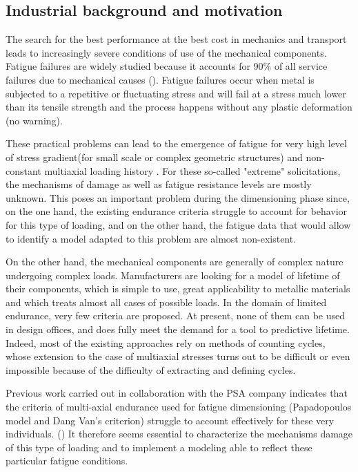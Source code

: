 \subsection{Industrial background and motivation}
The search for the best performance at the best cost in mechanics and
transport leads to increasingly
severe conditions of use of the mechanical components. Fatigue failures are widely studied
because it accounts for 90\% of all service
failures due to mechanical causes (\cite{sohar2011lifetime}).  Fatigue failures occur when metal is
subjected to a repetitive or fluctuating
stress and will fail at a stress much lower
than its tensile strength and the process happens without any plastic
deformation (no warning).

These practical problems can lead to the emergence of fatigue for
very high level of stress gradient(for small scale or complex geometric structures) and non-constant multiaxial loading history
. For these so-called "extreme" solicitations, the mechanisms of damage
as well as fatigue resistance levels are mostly unknown.
This poses an important problem during the dimensioning phase since, on the one hand, the
existing endurance criteria struggle to account for behavior for this type of
loading, and on the other hand, the fatigue data that would allow to identify a model
adapted to this problem are almost non-existent.

On the other hand, the mechanical components are generally of complex nature undergoing
complex loads. Manufacturers are looking for a model of lifetime
of their components, which is simple to use, great applicability to metallic materials
and which treats almost all cases of possible loads. In the domain of
limited endurance, very few criteria are proposed. At present, none of them
can be used in design offices, and does fully meet the demand for a tool to
predictive lifetime. Indeed, most of the existing approaches rely on
methods of counting cycles, whose extension to the case of multiaxial stresses turns out to be
difficult or even impossible because of the difficulty of extracting and defining cycles.

Previous work carried out in collaboration with the PSA company indicates that the criteria
of multi-axial endurance used for fatigue dimensioning (Papadopoulos model
and Dang Van's criterion) struggle to account effectively for these very
individuals. (\cite{koutiri2011effet}) It therefore seems essential to characterize the mechanisms
damage of this type of loading and to implement a modeling
able to reflect these particular fatigue conditions.

